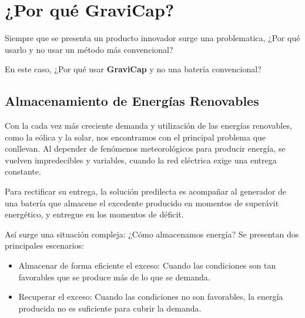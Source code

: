             
        \section{¿Por qué \textcolor{dark_violet}{\textbf{GraviCap}}?}
            Siempre que se presenta un producto innovador surge una problematica, ¿Por qué usarlo y no usar un método más convencional?\par
            En este caso, ¿Por qué usar \textcolor{dark_violet}{\textbf{GraviCap}} y no una batería convencional?\par
            
            \subsection{Almacenamiento de Energías Renovables}
                Con la cada vez más creciente demanda y utilización de las energías renovables, como la eólica y la solar, nos encontramos con el principal problema que conllevan. Al depender de fenómenos meteorológicos para producir energía, se vuelven impredecibles y variables, cuando la red eléctrica exige una entrega constante.\par
                Para rectificar su entrega, la solución predilecta es acompañar al generador de una batería que almacene el excedente producido en momentos de superávit energético, y entregue en los momentos de déficit.\par
                Así surge una situación compleja: ¿Cómo almacenamos energía? Se presentan dos principales escenarios:\par

                \begin{itemize} [label=•]
                    \setlength{\itemindent}{1.5em}
                        \item Almacenar de forma eficiente el exceso: Cuando las condiciones son tan favorables que se produce más de lo que se demanda.\par
                        \item Recuperar el exceso: Cuando las condiciones no son favorables, la energía producida no es suficiente para cubrir la demanda.\par
                \end{itemize}
                
